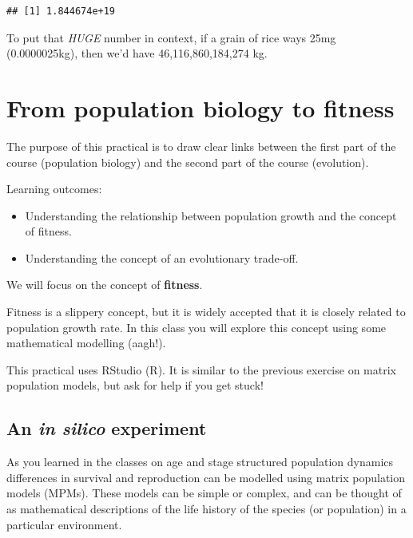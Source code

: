 \documentclass[
  a4paper]{book}
\providecommand{\tightlist}{%
  \setlength{\itemsep}{0pt}\setlength{\parskip}{0pt}}
\begin{document}
\begin{verbatim}
## [1] 1.844674e+19
\end{verbatim}

To put that \emph{HUGE} number in context, if a grain of rice ways 25mg (0.0000025kg), then we'd have 46,116,860,184,274 kg.

\hypertarget{from-population-biology-to-fitness}{%
\chapter{From population biology to fitness}\label{from-population-biology-to-fitness}}

The purpose of this practical is to draw clear links between the first part of the course (population biology) and the second part of the course (evolution).

\begin{do-something}
Learning outcomes:

\begin{itemize}
\tightlist
\item
  Understanding the relationship between population growth and the
  concept of fitness.
\item
  Understanding the concept of an evolutionary trade-off.
\end{itemize}
\end{do-something}

We will focus on the concept of \textbf{fitness}.

Fitness is a slippery concept, but it is widely accepted that it is closely related to population growth rate. In this class you will explore this concept using some mathematical modelling (aagh!).

\begin{do-something}
This practical uses RStudio (R). It is similar to the previous exercise
on matrix population models, but ask for help if you get stuck!
\end{do-something}

\hypertarget{an-in-silico-experiment}{%
\section{\texorpdfstring{An \emph{in silico} experiment}{An in silico experiment}}\label{an-in-silico-experiment}}

As you learned in the classes on age and stage structured population dynamics differences in survival and reproduction can be modelled using matrix population models (MPMs). These models can be simple or complex, and can be thought of as mathematical descriptions of the life history of the species (or population) in a particular environment.
\end{document}
